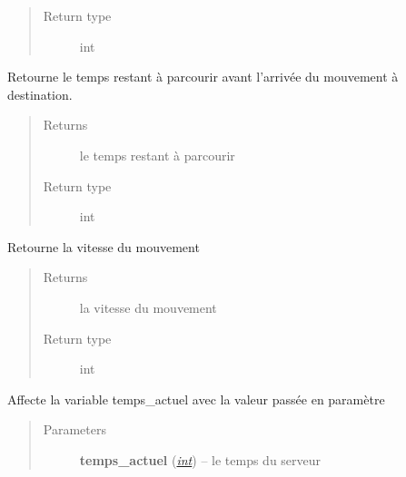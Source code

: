 \documentclass[letterpaper,10pt,english]{sphinxmanual}
\begin{document}
\begin{fulllineitems}
\begin{fulllineitems}
\begin{quote}
\begin{description}
\item[{Return type}] \leavevmode
int

\end{description}\end{quote}

\end{fulllineitems}


\begin{fulllineitems}
\label{index:Mouvement.Mouvement.getTempsRestant}
Retourne le temps restant à parcourir avant l'arrivée du mouvement à destination.
\begin{quote}\begin{description}
\item[{Returns}] \leavevmode
le temps restant à parcourir

\item[{Return type}] \leavevmode
int

\end{description}\end{quote}

\end{fulllineitems}


\begin{fulllineitems}
\label{index:Mouvement.Mouvement.getVitesse}
Retourne la vitesse du mouvement
\begin{quote}\begin{description}
\item[{Returns}] \leavevmode
la vitesse du mouvement

\item[{Return type}] \leavevmode
int

\end{description}\end{quote}

\end{fulllineitems}


\begin{fulllineitems}
\label{index:Mouvement.Mouvement.setTempsActuel}
Affecte la variable temps\_actuel avec la valeur passée en paramètre
\begin{quote}\begin{description}
\item[{Parameters}] \leavevmode
\textbf{temps\_actuel} (\href{http://docs.python.org/library/functions.html\#int}{\emph{int}}) -- le temps du serveur


\end{description}
\end{quote}
\end{fulllineitems}
\end{fulllineitems}
\end{document}
